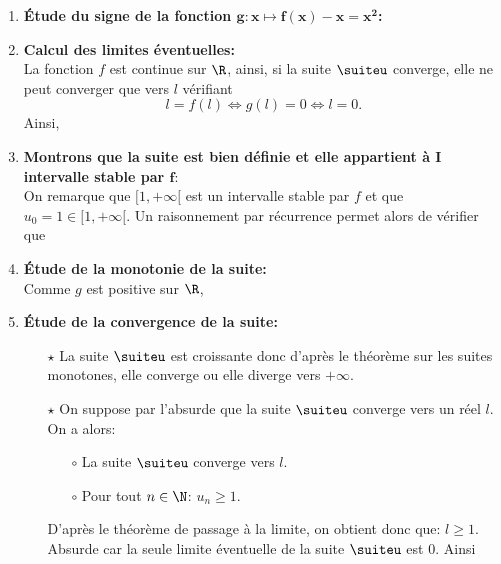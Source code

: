 \begin{correction}
\begin{enumerate}
\item \textbf{\'Etude du signe de la fonction $\mathbf{g: x\mapsto f(x)-x=x^2}$:}\\
\noindent {}
\item \textbf{Calcul des limites \'eventuelles:}\\
\noindent La fonction $f$ est continue sur $\R$, ainsi, si la suite $\suiteu$ converge, elle ne peut converger que vers $l$ v\'erifiant 
$$l=f(l)\Leftrightarrow g(l)=0\Leftrightarrow l=0.$$
Ainsi, 
\item \textbf{Montrons que la suite est bien d\'efinie et elle appartient \`{a} $\mathbf{I}$ intervalle stable par $\mathbf{f}$}:\\
\noindent On remarque que $[ 1,+\infty[$ est un intervalle stable par $f$ et que $u_0=1\in\lbrack 1,+\infty\lbrack$. Un raisonnement par r\'ecurrence permet alors de v\'erifier que 
\noindent 
\item \textbf{\'Etude de la monotonie de la suite:}\\
Comme $g$ est positive sur $\R$, 
\noindent 
\item \textbf{\'Etude de la convergence de la suite:}\\
\begin{itemize}
\item[$\star$] La suite $\suiteu$ est croissante donc d'apr\`{e}s le th\'eor\`{e}me sur les suites monotones, elle converge ou elle diverge vers $+\infty$.
\item[$\star$] On suppose par l'absurde que la suite $\suiteu$ converge vers un r\'eel $l$. On a alors:
\begin{itemize}
\item[$\circ$] La suite $\suiteu$ converge vers $l$.
\item[$\circ$] Pour tout $n\in\N$: $u_n\geq 1$.
\end{itemize}
D'apr\`{e}s le th\'eor\`{e}me de passage \`{a} la limite, on obtient donc que: $l\geq 1$. Absurde car la seule limite \'eventuelle de la suite $\suiteu$ est 0. Ainsi 
\end{itemize}
\end{enumerate}



\end{correction}